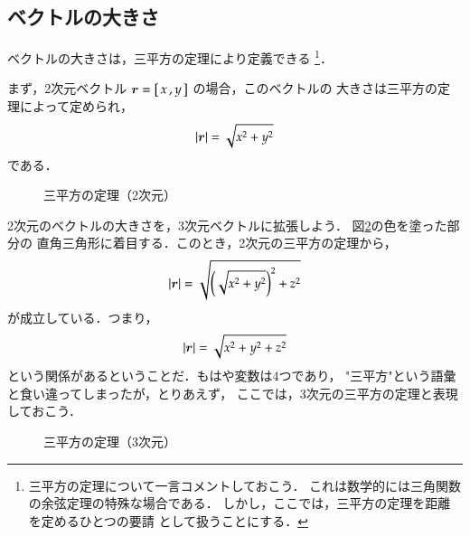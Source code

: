             \subsection{ベクトルの大きさ}
                ベクトルの大きさは，三平方の定理により定義できる
                    \footnote{
                        三平方の定理について一言コメントしておこう．
                        これは数学的には三角関数の余弦定理の特殊な場合である．
                        しかし，ここでは，三平方の定理を距離を定めるひとつの要請
                        として扱うことにする．
                    }．

                まず，2次元ベクトル $\boldsymbol{r}=\left[\,x\,,y\, \right]$ の場合，このベクトルの
                大きさは三平方の定理によって定められ，
                    \begin{align}
                        |\boldsymbol{r}| = \sqrt{x^{2} + y^{2}}
                    \end{align}
                である．
                        \begin{figure}[hbt]
                            \begin{center}
                                \caption{三平方の定理（2次元）}
                                \label{fig:SanHeihouNoTeiri_2D_01}
                            \end{center}
                        \end{figure}

                2次元のベクトルの大きさを，3次元ベクトルに拡張しよう．
                図\ref{fig:SanHeihouNoTeiri_3D_01}の色を塗った部分の
                直角三角形に着目する．このとき，2次元の三平方の定理から，
                    \begin{equation*}
                        |\boldsymbol{r}| = \sqrt{\left(\sqrt{x^{2} + y^{2}}\right)^{2} + z^{2}}
                    \end{equation*}
                が成立している．つまり，
                    \begin{align}
                        |\boldsymbol{r}| = \sqrt{{x}^{2} + {y}^{2} + {z}^{2}}
                    \end{align}
                という関係があるということだ．もはや変数は4つであり，
                "三平方"という語彙と食い違ってしまったが，とりあえず，
                ここでは，3次元の三平方の定理と表現しておこう．
                        \begin{figure}[hbt]
                            \begin{center}
                                \caption{三平方の定理（3次元）}
                                \label{fig:SanHeihouNoTeiri_3D_01}
                            \end{center}
                        \end{figure}

